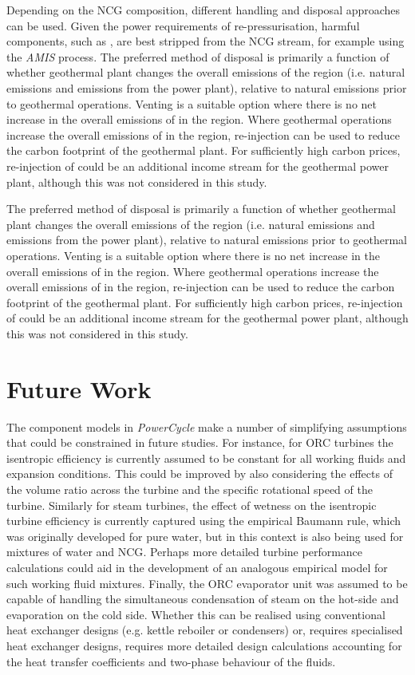         Depending on the \ac{NCG} composition, different handling and disposal approaches can be used. Given the power requirements of re-pressurisation, harmful components, such as , are best stripped from the \ac{NCG} stream, for example using the \emph{AMIS} process. The preferred method of  disposal is primarily a function of whether geothermal plant changes the overall emissions of the region (i.e. natural emissions and emissions from the power plant), relative to natural emissions prior to geothermal operations. Venting is a suitable option where there is no net increase in the overall emissions of  in the region. Where geothermal operations increase the overall emissions of  in the region, re-injection can be used to reduce the carbon footprint of the geothermal plant. For sufficiently high carbon prices, re-injection of  could be an additional income stream for the geothermal power plant, although this was not considered in this study.

        The preferred method of  disposal is primarily a function of whether geothermal plant changes the overall emissions of the region (i.e. natural emissions and emissions from the power plant), relative to natural emissions prior to geothermal operations. Venting is a suitable option where there is no net increase in the overall emissions of  in the region. Where geothermal operations increase the overall emissions of  in the region, re-injection can be used to reduce the carbon footprint of the geothermal plant. For sufficiently high carbon prices, re-injection of  could be an additional income stream for the geothermal power plant, although this was not considered in this study.
        
\section{Future Work}
    The component models in \emph{PowerCycle} make a number of simplifying assumptions that could be constrained in future studies. For instance, for \ac{ORC} turbines the isentropic efficiency is currently assumed to be constant for all working fluids and expansion conditions. This could be improved by also considering the effects of the volume ratio across the turbine and the specific rotational speed of the turbine. Similarly for steam turbines, the effect of wetness on the isentropic turbine efficiency is currently captured using the empirical Baumann rule, which was originally developed for pure water, but in this context is also being used for mixtures of water and \ac{NCG}. Perhaps more detailed turbine performance calculations could aid in the development of an analogous empirical model for such working fluid mixtures. Finally, the \ac{ORC} evaporator unit was assumed to be capable of handling the simultaneous condensation of steam on the hot-side and evaporation on the cold side. Whether this can be realised using conventional heat exchanger designs (e.g. kettle reboiler or condensers) or, requires specialised heat exchanger designs, requires more detailed design calculations accounting for the heat transfer coefficients and two-phase behaviour of the fluids.

